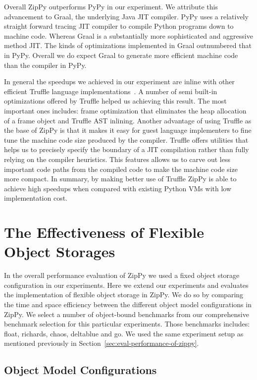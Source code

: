 Overall ZipPy outperforms PyPy in our experiment.
We attribute this advancement to Graal, the underlying Java JIT compiler.
PyPy uses a relatively straight forward tracing JIT compiler to compile Python programs down to machine code.
Whereas Graal is a substantially more sophisticated and aggressive method JIT.
The kinds of optimizations implemented in Graal outnumbered that in PyPy.
Overall we do expect Graal to generate more efficient machine code than the compiler in PyPy.

In general the speedups we achieved in our experiment are inline with other efficient Truffle language implementations~\cite{seaton2014debugging,Grimmer+2014,Grimmer+2014TruffleC}.
A number of semi built-in optimizations offered by Truffle helped us achieving this result.
The most important ones includes: frame optimization that eliminates the heap allocation of a frame object and Truffle AST inlining.
Another advantage of using Truffle as the base of ZipPy is that it makes it easy for guest language implementers to fine tune the machine code size produced by the compiler.
Truffle offers utilities that helps us to precisely specify the boundary of a JIT compilation rather than fully relying on the compiler heuristics.
This features allows us to carve out less important code paths from the compiled code to make the machine code size more compact.
In summary, by making better use of Truffle ZipPy is able to achieve high speedups when compared with existing Python VMs with low implementation cost.

\section{The Effectiveness of Flexible Object Storages}

In the overall performance evaluation of ZipPy we used a fixed object storage configuration in our experiments.
Here we extend our experiments and evaluates the implementation of flexible object storage in ZipPy.
We do so by comparing the time and space efficiency between the different object model configurations in ZipPy.
We select a number of object-bound benchmarks from our comprehensive benchmark selection for this particular experiments.
Those benchmarks includes: \textsf{float}, \textsf{richards}, \textsf{chaos}, \textsf{deltablue} and \textsf{go}.
We used the same experiment setup as mentioned previously in Section~\ref{sec:eval-performance-of-zippy}.

\subsection{Object Model Configurations}

